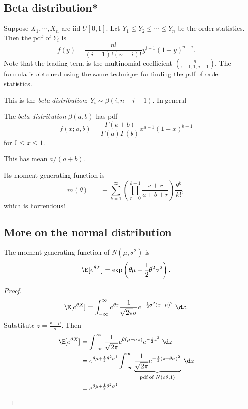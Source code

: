 \documentclass[a4paper]{article}
\begin{document}
\subsection{Beta distribution*}
Suppose $X_1, \cdots, X_n$ are iid $U[0, 1]$. Let $Y_1 \leq Y_2 \leq \cdots \leq Y_n$ be the order statistics. Then the pdf of $Y_i$ is
\[
  f(y) = \frac{n!}{(i - 1)!(n - i)!}y^{i - 1}(1 - y)^{n - i}.
\]
Note that the leading term is the multinomial coefficient $\binom{n}{i - 1, 1, n - 1}$. The formula is obtained using the same technique for finding the pdf of order statistics.

This is the \emph{beta distribution}: $Y_i \sim \beta(i, n - i + 1)$. In general
\begin{defi}
  The \emph{beta distribution} $\beta(a, b)$ has pdf
  \[
    f(x; a, b) = \frac{\Gamma(a + b)}{\Gamma(a)\Gamma(b)}x^{a - 1}(1 - x)^{b - 1}
  \]
  for $0 \leq x \leq 1$.

  This has mean $a/(a + b)$.
\end{defi}
Its moment generating function is
\[
  m(\theta) = 1 + \sum_{k = 1}^\infty \left(\prod_{r = 0}^{k - 1}\frac{a + r}{a + b + r}\right)\frac{\theta^k}{k!},
\]
which is horrendous!

\subsection{More on the normal distribution}
\begin{prop}
  The moment generating function of $N(\mu, \sigma^2)$ is
  \[
    \E[e^{\theta X}] = \exp\left(\theta\mu + \frac{1}{2}\theta^2 \sigma^2\right).
  \]
\end{prop}

\begin{proof}
 \[
  \E[e^{\theta X}] = \int_{-\infty}^\infty e^{\theta x} \frac{1}{\sqrt{2\pi} \sigma} e^{-\frac{1}{2}\sigma^2 (x - \mu)^2}\;\d x.
\]
Substitute $z = \frac{x - \mu}{\sigma}$. Then
\begin{align*}
  \E[e^{\theta X}] &= \int_{-\infty}^\infty \frac{1}{\sqrt{2\pi}}e^{\theta(\mu + \sigma z)} e^{-\frac{1}{2}z^2}\;\d z\\
  &= e^{\theta\mu + \frac{1}{2}\theta^2\sigma^2}\int_{-\infty}^\infty \underbrace{\frac{1}{\sqrt{2\pi}}e^{-\frac{1}{2}(z - \theta \sigma)^2}}_{\text{pdf of }N(\sigma\theta, 1)}\;\d z\\
  &= e^{\theta\mu + \frac{1}{2}\theta^2\sigma^2}.
\end{align*}
\end{proof}
\end{document}
